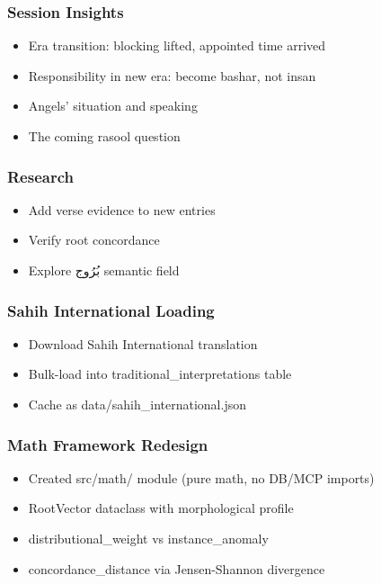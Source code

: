 \documentclass[12pt,a4paper]{article}
\providecommand{\tightlist}{\setlength{\itemsep}{0pt}\setlength{\parskip}{0pt}}
\begin{document}
\subsubsection{Session Insights}\label{session-insights}

\begin{itemize}
\tightlist
\item
  Era transition: blocking lifted, appointed time arrived
\item
  Responsibility in new era: become bashar, not insan
\item
  Angels' situation and speaking
\item
  The coming rasool question
\end{itemize}

\subsubsection{Research}\label{research}

\begin{itemize}
\tightlist
\item
  Add verse evidence to new entries
\item
  Verify root concordance
\item
  Explore بُرُوج semantic field
\end{itemize}

\subsubsection{Sahih International
Loading}\label{sahih-international-loading}

\begin{itemize}
\tightlist
\item
  Download Sahih International translation
\item
  Bulk-load into traditional\_interpretations table
\item
  Cache as data/sahih\_international.json
\end{itemize}

\subsubsection{Math Framework Redesign}\label{math-framework-redesign}

\begin{itemize}
\tightlist
\item
  Created src/math/ module (pure math, no DB/MCP imports)
\item
  RootVector dataclass with morphological profile
\item
  distributional\_weight vs instance\_anomaly
\item
  concordance\_distance via Jensen-Shannon divergence
\end{itemize}
\end{document}
